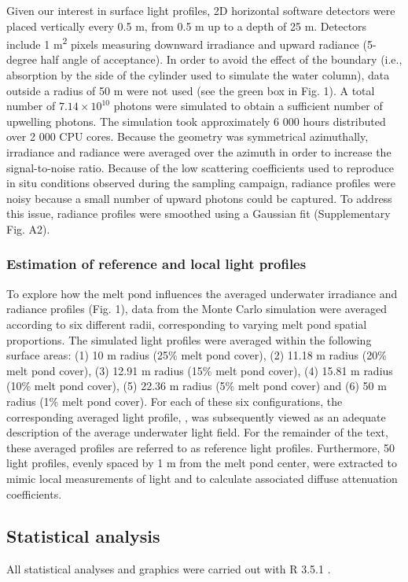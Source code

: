 Given our interest in surface light profiles, 2D horizontal software detectors were placed vertically every 0.5 m, from 0.5 m up to a depth of 25 m. Detectors include 1 m\textsuperscript{2} pixels measuring downward irradiance and upward radiance (5-degree half angle of acceptance). In order to avoid the effect of the boundary (i.e., absorption by the side of the cylinder used to simulate the water column), data outside a radius of 50 m were not used (see the green box in Fig. 1). A total number of $7.14 \times 10^{10}$ photons were simulated to obtain a sufficient number of upwelling photons. The simulation took approximately 6 000 hours distributed over 2 000 CPU cores. Because the geometry was symmetrical azimuthally, irradiance and radiance were averaged over the azimuth in order to increase the signal-to-noise ratio. Because of the low scattering coefficients used to reproduce in situ conditions observed during the sampling campaign, radiance profiles were noisy because a small number of upward photons could be captured. To address this issue, radiance profiles were smoothed using a Gaussian fit (Supplementary Fig. A2). 

\subsubsection{Estimation of reference and local light profiles}

To explore how the melt pond influences the averaged underwater irradiance and radiance profiles (Fig. 1), data from the Monte Carlo simulation were averaged according to six different radii, corresponding to varying melt pond spatial proportions. The simulated light profiles were averaged within the following surface areas: (1) 10 m radius (25\% melt pond cover), (2) 11.18 m radius (20\% melt pond cover), (3) 12.91 m radius (15\% melt pond cover), (4) 15.81 m radius (10\% melt pond cover), (5) 22.36 m radius (5\% melt pond cover) and (6) 50 m radius (1\% melt pond cover). For each of these six configurations, the corresponding averaged light profile, \meanedz{}, was subsequently viewed as an adequate description of the average underwater light field. For the remainder of the text, these averaged profiles are referred to as reference light profiles. Furthermore, 50 light profiles, evenly spaced by 1 m from the melt pond center, were extracted to mimic local measurements of light and to calculate associated diffuse attenuation coefficients.

\subsection{Statistical analysis}

All statistical analyses and graphics were carried out with R 3.5.1 \citep{RCoreTeam2018}. 
